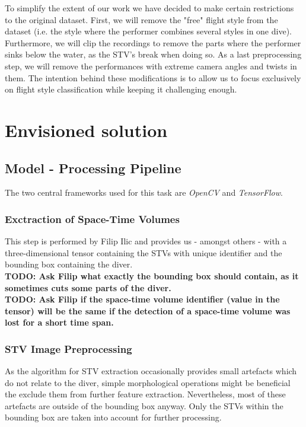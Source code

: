 \documentclass[10pt]{article}
\begin{document}
To simplify the extent of our work we have decided to make certain restrictions to the original dataset. First, we will remove the "free" flight style from the dataset (i.e. the style where the performer combines several styles in one dive). Furthermore, we will clip the recordings to remove the parts where the performer sinks below the water, as the STV's break when doing so. As a last preprocessing step, we will remove the performances with extreme camera angles and twists in them. The intention behind these modifications is to allow us to focus exclusively on flight style classification while keeping it challenging enough.

\section{Envisioned solution}

\subsection{Model - Processing Pipeline}
The two central frameworks used for this task are \emph{OpenCV} and \emph{TensorFlow}.

\subsubsection{Exctraction of Space-Time Volumes}
This step is performed by Filip Ilic and provides us - amongst others - with a three-dimensional tensor containing the STVs with unique identifier and the bounding box containing the diver.
\\
\textbf{TODO: Ask Filip what exactly the bounding box should contain, as it sometimes cuts some parts of the diver.}\\
\textbf{TODO: Ask Filip if the space-time volume identifier (value in the tensor) will be the same if the detection of a space-time volume was lost for a short time span.}

\subsubsection{STV Image Preprocessing}
As the algorithm for STV extraction occasionally provides small artefacts which do not relate to the diver, simple morphological operations might be beneficial the exclude them from further feature extraction. Nevertheless, most of these artefacts are outside of the bounding box anyway. Only the STVs within the bounding box are taken into account for further processing.
\end{document}
